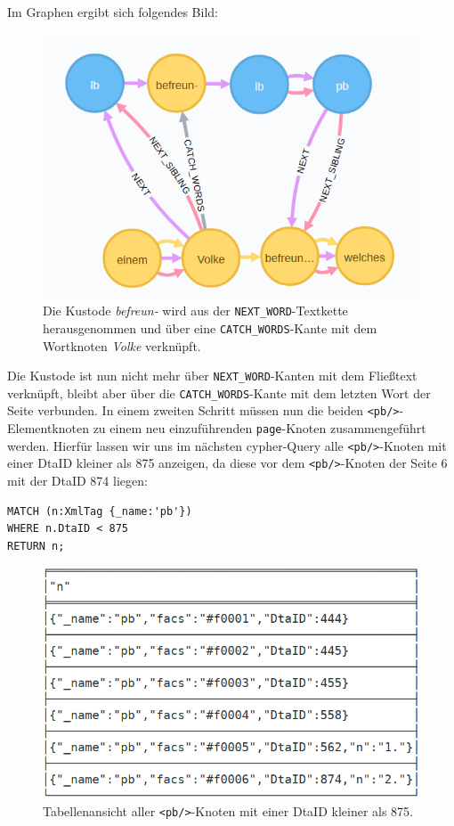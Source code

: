 \documentclass[ngerman,]{scrreprt}
\begin{document}
Im Graphen ergibt sich folgendes Bild:

\begin{figure}
\centering
\includegraphics{Bilder/TEI2Graph/fw-catch-words.png}
\caption{Die Kustode \emph{befreun-} wird aus der \texttt{NEXT\_WORD}-Textkette herausgenommen und über eine \texttt{CATCH\_WORDS}-Kante mit dem Wortknoten \emph{Volke} verknüpft.}
\end{figure}

Die Kustode ist nun nicht mehr über \texttt{NEXT\_WORD}-Kanten mit dem Fließtext verknüpft, bleibt aber über die \texttt{CATCH\_WORDS}-Kante mit dem letzten Wort der Seite verbunden. In einem zweiten Schritt müssen nun die beiden \texttt{\textless{}pb/\textgreater{}}-Elementknoten zu einem neu einzuführenden \texttt{page}-Knoten zusammengeführt werden. Hierfür lassen wir uns im nächsten cypher-Query alle \texttt{\textless{}pb/\textgreater{}}-Knoten mit einer DtaID kleiner als 875 anzeigen, da diese vor dem \texttt{\textless{}pb/\textgreater{}}-Knoten der Seite 6 mit der DtaID 874 liegen:

\begin{verbatim}
MATCH (n:XmlTag {_name:'pb'})
WHERE n.DtaID < 875
RETURN n;
\end{verbatim}

\begin{figure}
\centering
\includegraphics{Bilder/TEI2Graph/pb-Element-Tabelle.png}
\caption{Tabellenansicht aller \texttt{\textless{}pb/\textgreater{}}-Knoten mit einer DtaID kleiner als 875.}
\end{figure}
\end{document}
